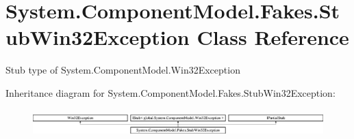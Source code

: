 \hypertarget{class_system_1_1_component_model_1_1_fakes_1_1_stub_win32_exception}{\section{System.\-Component\-Model.\-Fakes.\-Stub\-Win32\-Exception Class Reference}
\label{class_system_1_1_component_model_1_1_fakes_1_1_stub_win32_exception}
}


Stub type of System.\-Component\-Model.\-Win32\-Exception 


Inheritance diagram for System.\-Component\-Model.\-Fakes.\-Stub\-Win32\-Exception\-:\begin{figure}[H]
\begin{center}
\leavevmode
\includegraphics[height=1.078998cm]{class_system_1_1_component_model_1_1_fakes_1_1_stub_win32_exception}
\end{center}
\end{figure}
